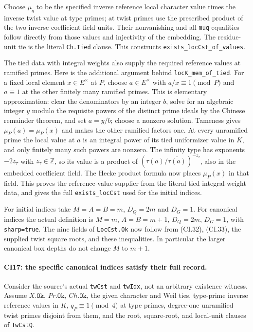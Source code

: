 Choose $\mu_q$ to be the specified inverse reference local
character value times the inverse twist value at type primes;
at twist primes use the prescribed product of the two inverse
coefficient-field units. Their nonvanishing and all \texttt{muq}
equalities follow directly from those values and injectivity
of the embedding. The residue-unit tie is the literal
\texttt{Ch.Tied} clause. This constructs
\texttt{exists\_locCst\_of\_values}.

The tied data with integral weights also supply the required
reference values at ramified primes. Here is the additional
argument behind \texttt{locK\_mem\_of\_tied}. For a fixed local
element $x\in E^\times$ at $P$, choose $a\in E^\times$ with
$a/x\equiv1\pmod P$ and $a\equiv1$ at the other finitely many
ramified primes. This is elementary approximation: clear the
denominators by an integer $b$, solve for an algebraic integer
$y$ modulo the requisite powers of the distinct prime ideals
by the Chinese remainder theorem, and set $a=y/b$; choose a
nonzero solution. Tameness gives $\mu_P(a)=\mu_P(x)$ and makes
the other ramified factors one. At every unramified prime the
local value at $a$ is an integral power of its tied uniformizer
value in $K$, and only finitely many such powers are nonzero.
The infinity type has exponents $-2z_\tau$ with $z_\tau\in\mathbb Z$,
so its value is a product of
$(\tau(a)/\overline{\tau(a)})^{-z_\tau}$, also in the embedded
coefficient field. The Hecke product formula now places
$\mu_P(x)$ in that field. This proves the reference-value
supplier from the literal tied integral-weight data, and gives
the full \texttt{exists\_locCst} used for the initial indices.

For initial indices take $M=A=B=m$, $D_Q=2m$ and
$D_G=1$. For canonical indices the actual definition is
$M=m$, $A=B=m+1$, $D_Q=2m$, $D_G=1$, with
\texttt{sharp=true}. The nine fields of \texttt{LocCst.Ok}
now follow from (CI.32), (CI.33), the supplied twist square
roots, and these inequalities. In particular the larger canonical
box depths do not change $M$ to $m+1$.

\paragraph{CI17: the specific canonical indices satisfy their full record.}
Consider the source's actual \texttt{twCst} and \texttt{twIdx},
not an arbitrary existence witness. Assume $X.\texttt{Ok}$,
$Pr.\texttt{Ok}$, $Ch.\texttt{Ok}$, the given character and
Weil ties, type-prime inverse reference values in $K$,
$q_P\equiv1\pmod4$ at type primes, degree-one unramified twist
primes disjoint from them, and the root, square-root, and
local-unit clauses of \texttt{TwCstQ}.

